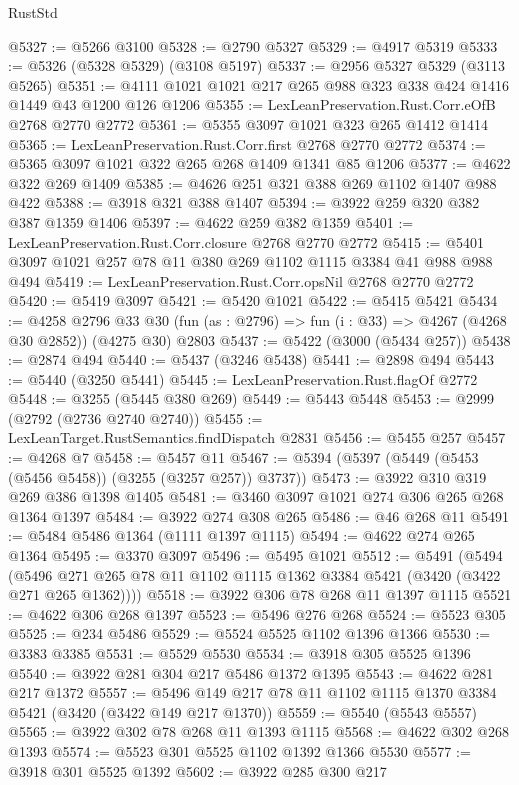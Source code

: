 \begin{lexlean}{RustStd}
\begin{coremodule}
{\begin{coremodule}
{{{{{{{{{{{{{{{{{{{{{{{{{{@5327 := @5266 @3100
@5328 := @2790 @5327
@5329 := @4917 @5319
@5333 := @5326 (@5328 @5329) (@3108 @5197)
@5337 := @2956 @5327 @5329 (@3113 @5265)
@5351 := @4111 @1021 @1021 @217 @265 @988 @323 @338 @424 @1416 @1449 @43 @1200 @126 @1206
@5355 := LexLeanPreservation.Rust.Corr.eOfB @2768 @2770 @2772
@5361 := @5355 @3097 @1021 @323 @265 @1412 @1414
@5365 := LexLeanPreservation.Rust.Corr.first @2768 @2770 @2772
@5374 := @5365 @3097 @1021 @322 @265 @268 @1409 @1341 @85 @1206
@5377 := @4622 @322 @269 @1409
@5385 := @4626 @251 @321 @388 @269 @1102 @1407 @988 @422
@5388 := @3918 @321 @388 @1407
@5394 := @3922 @259 @320 @382 @387 @1359 @1406
@5397 := @4622 @259 @382 @1359
@5401 := LexLeanPreservation.Rust.Corr.closure @2768 @2770 @2772
@5415 := @5401 @3097 @1021 @257 @78 @11 @380 @269 @1102 @1115 @3384 @41 @988 @988 @494
@5419 := LexLeanPreservation.Rust.Corr.opsNil @2768 @2770 @2772
@5420 := @5419 @3097
@5421 := @5420 @1021
@5422 := @5415 @5421
@5434 := @4258
    @2796
    @33
    @30
    (fun (as : @2796) => fun (i : @33) => @4267 (@4268 @30 @2852))
    (@4275 @30)
    @2803
@5437 := @5422 (@3000 (@5434 @257))
@5438 := @2874 @494
@5440 := @5437 (@3246 @5438)
@5441 := @2898 @494
@5443 := @5440 (@3250 @5441)
@5445 := LexLeanPreservation.Rust.flagOf @2772
@5448 := @3255 (@5445 @380 @269)
@5449 := @5443 @5448
@5453 := @2999 (@2792 (@2736 @2740 @2740))
@5455 := LexLeanTarget.RustSemantics.findDispatch @2831
@5456 := @5455 @257
@5457 := @4268 @7
@5458 := @5457 @11
@5467 := @5394 (@5397 (@5449 (@5453 (@5456 @5458)) (@3255 (@3257 @257)) @3737))
@5473 := @3922 @310 @319 @269 @386 @1398 @1405
@5481 := @3460 @3097 @1021 @274 @306 @265 @268 @1364 @1397
@5484 := @3922 @274 @308 @265
@5486 := @46 @268 @11
@5491 := @5484 @5486 @1364 (@1111 @1397 @1115)
@5494 := @4622 @274 @265 @1364
@5495 := @3370 @3097
@5496 := @5495 @1021
@5512 := @5491
    (@5494 (@5496 @271 @265 @78 @11 @1102 @1115 @1362 @3384 @5421 (@3420 (@3422 @271 @265 @1362))))
@5518 := @3922 @306 @78 @268 @11 @1397 @1115
@5521 := @4622 @306 @268 @1397
@5523 := @5496 @276 @268
@5524 := @5523 @305
@5525 := @234 @5486
@5529 := @5524 @5525 @1102 @1396 @1366
@5530 := @3383 @3385
@5531 := @5529 @5530
@5534 := @3918 @305 @5525 @1396
@5540 := @3922 @281 @304 @217 @5486 @1372 @1395
@5543 := @4622 @281 @217 @1372
@5557 := @5496 @149 @217 @78 @11 @1102 @1115 @1370 @3384 @5421 (@3420 (@3422 @149 @217 @1370))
@5559 := @5540 (@5543 @5557)
@5565 := @3922 @302 @78 @268 @11 @1393 @1115
@5568 := @4622 @302 @268 @1393
@5574 := @5523 @301 @5525 @1102 @1392 @1366 @5530
@5577 := @3918 @301 @5525 @1392
@5602 := @3922
    @285
    @300
    @217
}}}}}}}}}}}}}}}}}}}}}}}}}}
\end{coremodule}}
\end{coremodule}
\end{lexlean}
